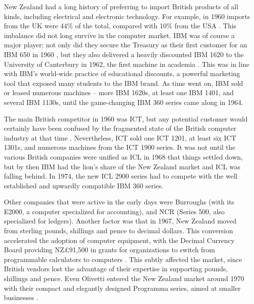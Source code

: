 \documentclass{IEEEcsmag}
\begin{document}
New Zealand had a long history of preferring to import British products of all kinds, including electrical and electronic technology.
\cbstart
For example, in 1960 imports from the UK were 44\% of the total, compared with 10\% from the USA \cite{Yearbook62}. This imbalance did not long survive in the computer market.
\cbend
IBM was of course a major player; not only did they secure the Treasury as their first customer for an IBM 650 in 1960 \cite{FirstCinNZ}, but they also delivered a heavily discounted IBM 1620 to the University of Canterbury in 1962, the first machine in academia \cite{Dale-Canty2}. This was in line with IBM’s world-wide practice of educational discounts, a powerful marketing tool that exposed many students to the IBM brand. As time went on, IBM sold or leased numerous machines -- more IBM 1620s, at least one IBM 1401, and several IBM 1130s, until the game-changing IBM 360 series came along in 1964.

The main British competitor in 1960 was ICT, but any potential customer would certainly have been confused by the fragmented state of the British computer industry at that time \cite{Hendry-1989}.
Nevertheless, ICT sold one ICT 1201, at least six ICT 1301s, and numerous machines from the ICT 1900 series.
It was not until the various British companies were unified as ICL in 1968 that things settled down, but by then IBM had the lion’s share of the New Zealand market and ICL was falling behind. In 1974, the new ICL 2900 series had to compete with the well established and upwardly compatible IBM 360 series.

Other companies that were active in the early days were Burroughs (with its E2000, a computer specialized for accounting), and NCR (Series 500, also specialized for ledgers). Another factor was that in 1967, New Zealand moved from sterling pounds, shillings and pence to decimal dollars. This conversion accelerated the adoption of computer equipment, with the Decimal Currency Board providing NZ£91,500 in grants for organizations to switch from programmable calculators to computers \cite{Treasury-1966}. This subtly affected the market, since British vendors lost the advantage of their expertise in supporting pounds, shillings and pence. Even Olivetti entered the New Zealand market around 1970 with their compact and elegantly designed Programma series, aimed at smaller businesses \cite{Taupo-Olivetti-1970}. 
\end{document}
